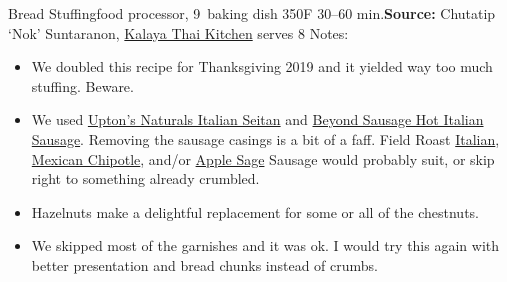 \begin{recipe}{Bread Stuffing}{food processor, 9\inch{}\inch\ baking dish \hfill 350\0F \hfill 30--60 min.}{\textbf{Source:} Chutatip `Nok' Suntaranon, \href{https://www.kalaya.net/}{Kalaya Thai Kitchen} \hfill serves 8}
 \freeform Notes:
 \begin{itemize}
  \item We doubled this recipe for Thanksgiving 2019 and it yielded way too much stuffing. Beware.
  \item We used \href{https://www.uptonsnaturals.com/products/italian-seitan}{Upton's Naturals Italian Seitan} and \href{https://www.beyondmeat.com/products/hot-italian/}{Beyond Sausage Hot Italian Sausage}. Removing the sausage casings is a bit of a faff. Field Roast \href{https://fieldroast.com/product/italian-sausage/}{Italian}, \href{https://fieldroast.com/product/mexican-chipotle-sausage/}{Mexican Chipotle}, and/or \href{https://fieldroast.com/product/smoked-apple-sage-sausage/}{Apple Sage} Sausage would probably suit, or skip right to something already crumbled.
  \item Hazelnuts make a delightful replacement for some or all of the chestnuts.
  \item We skipped most of the garnishes and it was ok. I would try this again with better presentation and bread chunks instead of crumbs.
 \end{itemize}
\end{recipe}

